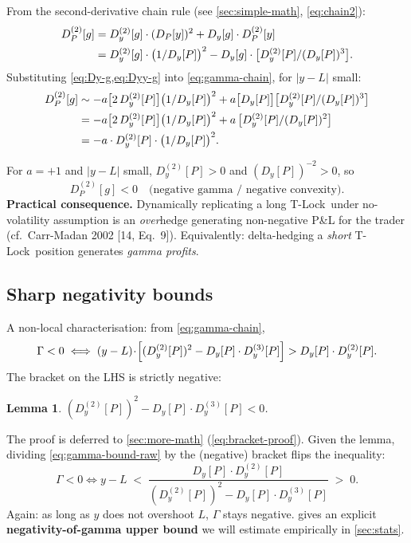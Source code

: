 \documentclass[11pt]{article}
\newtheorem{lemma}{Lemma}
\theoremstyle{definition}
\newcommand{\Tlock}{T-Lock}
\newcommand{\dDy}[1]{D_{y}^{(#1)}}              %
\newcommand{\dDP}[1]{D_{P}^{(#1)}}              %
\begin{document}
From the second-derivative chain rule (see \cref{sec:simple-math},
\cref{eq:chain2}):
\begin{align}
\dDP{2}[g]
  &= \dDy{2}[g]\cdot(D_P[y])^2 + D_y[g]\cdot\dDP{2}[y]
  \notag \\
  &= \dDy{2}[g]\cdot\bigl(1/D_y[P]\bigr)^2
   - D_y[g]\cdot\bigl[\dDy{2}[P]/(D_y[P])^3\bigr].
\label{eq:gamma-chain}
\end{align}
Substituting \cref{eq:Dy-g,eq:Dyy-g} into \cref{eq:gamma-chain}, for
$|y-L|$ small:
\begin{align}
\dDP{2}[g]
  &\sim -a\bigl[2\,\dDy{2}[P]\bigr]\bigl(1/D_y[P]\bigr)^2
        + a\bigl[D_y[P]\bigr]\bigl[\dDy{2}[P]/(D_y[P])^3\bigr] \notag\\
  &=    -a\bigl[2\,\dDy{2}[P]\bigr]\bigl(1/D_y[P]\bigr)^2
        + a\,\bigl[\dDy{2}[P]/(D_y[P])^2\bigr] \notag\\
  &=    -a\cdot\dDy{2}[P]\cdot\bigl(1/D_y[P]\bigr)^2.
\label{eq:gamma-local}
\end{align}

For $a=+1$ and $|y-L|$ small, $\dDy{2}[P]>0$ and $(D_y[P])^{-2}>0$, so
\[
\boxed{\dDP{2}[g] < 0 \quad\text{(negative gamma / negative convexity).}}
\]
\textbf{Practical consequence.} Dynamically replicating a long \Tlock\
under no-volatility assumption is an \emph{over}hedge generating
non-negative P\&L for the trader (cf.\ Carr-Madan 2002 [14, Eq.~9]).
Equivalently: delta-hedging a \emph{short} \Tlock\ position generates
\emph{gamma profits}.

\subsection{Sharp negativity bounds}

A non-local characterisation: from \cref{eq:gamma-chain},
\begin{equation}
\Gamma < 0
\iff
(y-L)\!\cdot\!\Bigl[(\dDy{2}[P])^2 - D_y[P]\cdot\dDy{3}[P]\Bigr]
> D_y[P]\cdot\dDy{2}[P].
\label{eq:gamma-bound-raw}
\end{equation}
The bracket on the LHS is strictly negative:
\begin{lemma}\label{lem:bracket}
$(\dDy{2}[P])^2 - D_y[P]\cdot\dDy{3}[P] < 0$.
\end{lemma}
The proof is deferred to \cref{sec:more-math} (\cref{eq:bracket-proof}).
Given the lemma, dividing \cref{eq:gamma-bound-raw} by the (negative)
bracket flips the inequality:
\begin{equation}
\Gamma < 0
\iff
y - L \;<\;
\frac{D_y[P]\cdot\dDy{2}[P]}{(\dDy{2}[P])^2 - D_y[P]\cdot\dDy{3}[P]}
\;>\; 0.
\label{eq:gamma-bound}
\end{equation}
Again: as long as $y$ does not overshoot $L$, $\Gamma$ stays negative.
\Cref{eq:gamma-bound} gives an explicit \textbf{negativity-of-gamma
upper bound} we will estimate empirically in \cref{sec:stats}.
\end{document}
